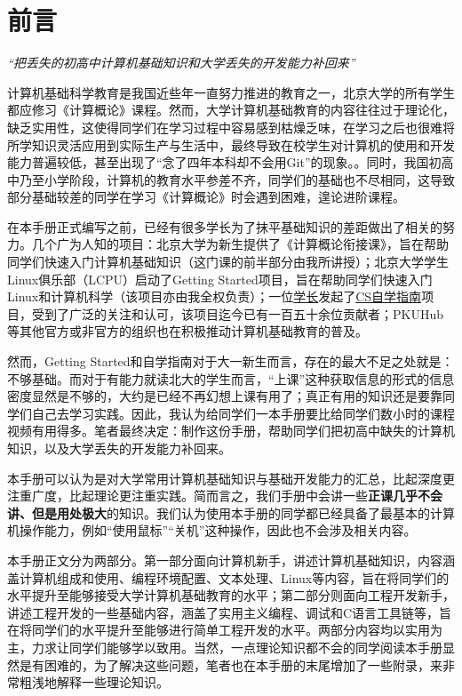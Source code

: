 \documentclass[../main.tex]{subfiles}
\begin{document}
\chapter{前言}

\begin{center}
  \emph{“把丢失的初高中计算机基础知识和大学丢失的开发能力补回来”}
\end{center}

计算机基础科学教育是我国近些年一直努力推进的教育之一，北京大学的所有学生都应修习《计算概论》课程。然而，大学计算机基础教育的内容往往过于理论化，缺乏实用性，这使得同学们在学习过程中容易感到枯燥乏味，在学习之后也很难将所学知识灵活应用到实际生产与生活中，最终导致在校学生对计算机的使用和开发能力普遍较低，甚至出现了“念了四年本科却不会用Git”的现象。。同时，我国初高中乃至小学阶段，计算机的教育水平参差不齐，同学们的基础也不尽相同，这导致部分基础较差的同学在学习《计算概论》时会遇到困难，遑论进阶课程。

在本手册正式编写之前，已经有很多学长为了抹平基础知识的差距做出了相关的努力。几个广为人知的项目：北京大学为新生提供了《计算概论衔接课》，旨在帮助同学们快速入门计算机基础知识（这门课的前半部分由我所讲授）；北京大学学生Linux俱乐部（LCPU）启动了Getting Started项目，旨在帮助同学们快速入门Linux和计算机科学（该项目亦由我全权负责）；一位\faGithub\href{https://github.com/PKUFlyingPig}{学长}发起了\href{https://csdiy.wiki/}{CS自学指南}项目，受到了广泛的关注和认可，该项目迄今已有一百五十余位贡献者；PKUHub等其他官方或非官方的组织也在积极推动计算机基础教育的普及。

然而，Getting Started和自学指南对于大一新生而言，存在的最大不足之处就是：不够基础。而对于有能力就读北大的学生而言，“上课”这种获取信息的形式的信息密度显然是不够的，大约是已经不再幻想上课有用了；真正有用的知识还是要靠同学们自己去学习实践。因此，我认为给同学们一本手册要比给同学们数小时的课程视频有用得多。笔者最终决定：制作这份手册，帮助同学们把初高中缺失的计算机知识，以及大学丢失的开发能力补回来。

本手册可以认为是对大学常用计算机基础知识与基础开发能力的汇总，比起深度更注重广度，比起理论更注重实践。简而言之，我们手册中会讲一些\textbf{正课几乎不会讲、但是用处极大}的知识。我们认为使用本手册的同学都已经具备了最基本的计算机操作能力，例如“使用鼠标”“关机”这种操作，因此也不会涉及相关内容。

本手册正文分为两部分。第一部分面向计算机新手，讲述计算机基础知识，内容涵盖计算机组成和使用、编程环境配置、文本处理、Linux等内容，旨在将同学们的水平提升至能够接受大学计算机基础教育的水平；第二部分则面向工程开发新手，讲述工程开发的一些基础内容，涵盖了实用主义编程、调试和C语言工具链等，旨在将同学们的水平提升至能够进行简单工程开发的水平。两部分内容均以实用为主，力求让同学们能够学以致用。当然，一点理论知识都不会的同学阅读本手册显然是有困难的，为了解决这些问题，笔者也在本手册的末尾增加了一些附录，来非常粗浅地解释一些理论知识。
\end{document}
